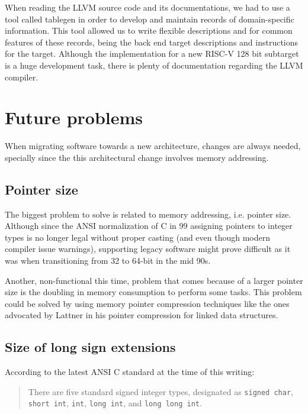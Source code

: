 \documentclass[a4paper,conference]{IEEEtran}
\newcommand{\riscv}{\textsc{\small RISC-V}\xspace}
\begin{document}
When reading the LLVM source code and its documentations, we had to use a tool called tablegen in order to develop and maintain records of domain-specific information. This tool allowed us to write flexible descriptions and for common features of these records, being the back end target descriptions and instructions for the target.
Although the implementation for a new \riscv 128 bit subtarget is a huge development task, there is plenty of documentation regarding the LLVM compiler. 

\section{Future problems}
\label{sec:fp}
When migrating software towards a new architecture, changes are always needed, specially since the this architectural change involves memory addressing.

\subsection{Pointer size}

The biggest problem to solve is related to memory addressing, i.e. pointer size.
Although since the ANSI normalization of C in 99 assigning pointers to integer types is no longer legal without proper casting (and even though modern compiler issue warnings), supporting legacy software might prove difficult as it was when transitioning from 32 to 64-bit in the mid 90s.

Another, non-functional this time, problem that comes because of a larger pointer size is the doubling in memory consumption to perform some tasks. This problem could be solved by using memory pointer compression techniques like the ones advocated by Lattner\cite{lattner2005} in his pointer compression for linked data structures.

\subsection{Size of long sign extensions}

According to the latest ANSI C standard at the time of this writing\cite{ansiC17}:
\begin{quote}
	There are five standard signed integer types, designated as \texttt{signed char}, \texttt{short int}, \texttt{int}, \texttt{long int}, and \texttt{long long int}.
\end{quote}
\end{document}
